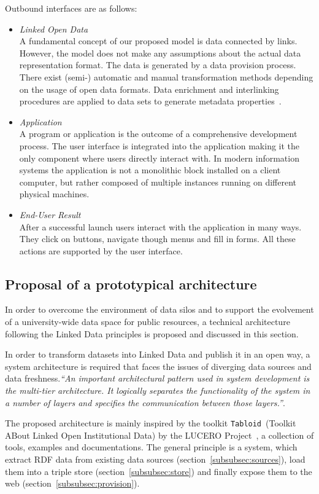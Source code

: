 \documentclass{article}
\begin{document}
Outbound interfaces are as follows:
\begin{itemize}
	\item \textit{Linked Open Data}~\\
	A fundamental concept of our proposed model is data connected by links. However, the model does not make any assumptions about the actual data representation format. The data is generated by a data provision process. There exist (semi-) automatic and manual transformation methods depending on the usage of open data formats. Data enrichment and interlinking procedures are applied to data sets to generate metadata properties~\cite{inproceedings:soa-architecture}. 
	\item \textit{Application}~\\
	A program or application is the outcome of a comprehensive development process. The user interface is integrated into the application making it the only component where users directly interact with. In modern information systems the application is not a monolithic block installed on a client computer, but rather composed of multiple instances running on different physical machines. 
	\item \textit{End-User Result}~\\
	After a successful launch users interact with the application in many ways. They click on buttons, navigate though menus and fill in forms. All these actions are supported by the user interface.
\end{itemize}

\subsection{Proposal of a prototypical architecture}
\label{sec:application_architecture}
In order to overcome the environment of data silos and to support the evolvement of a university-wide data space for public resources, a technical architecture following the Linked Data principles is proposed and discussed in this section. 

In order to transform datasets into Linked Data and publish it in an open way, a system architecture is required that faces the issues of diverging data sources and data freshness.\textit{``An important architectural pattern used in system development is the multi-tier architecture. It logically separates the functionality of the system in a number of layers and specifies the communication between those layers.''}\cite{simperl_using_2013}.

The proposed architecture is mainly inspired by the toolkit \texttt{Tabloid}~(Toolkit ABout Linked Open Institutional Data) by the LUCERO Project~\cite{url:lucero-tabloid}, a collection of tools, examples and documentations. The general principle is a system, which extract RDF data from existing data sources (section~\ref{subsubsec:sources}), load them into a triple store (section~\ref{subsubsec:store}) and finally expose them to the web (section~\ref{subsubsec:provision}). 
\end{document}
